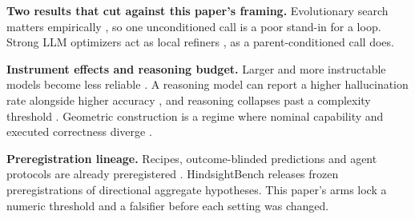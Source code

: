 \textbf{Two results that cut against this paper's framing.} Evolutionary search matters
empirically \citep{zhang2024understandingimportanceevolutionarysearch}, so one unconditioned
call is a poor stand-in for a loop. Strong LLM optimizers act as local refiners
\citep{zhang2026makesllmgoodoptimizer}, as a parent-conditioned call does.

\textbf{Instrument effects and reasoning budget.} Larger and more instructable models become
less reliable \citep{zhou2024reliability}. A reasoning model can report a higher
hallucination rate alongside higher accuracy \citep{openai2025o3o4systemcard}, and reasoning
collapses past a complexity threshold
\citep{shojaee2025illusionthinkingunderstandingstrengths}. Geometric construction is a regime
where nominal capability and executed correctness diverge
\citep{kim2026geobuildbenchbenchmarkinteractiveexecutable,balunovic2025mathconstructchallengingllmreasoning}.

\textbf{Preregistration lineage.} Recipes, outcome-blinded predictions and agent protocols
are already preregistered
\citep{thomas2026mitigatingllmbasedphackingpreregistering,williams2026predictingllmsafetyrelease,vaccaro2026preregistrationexperimentsaiagents,zhang2026testingfrontierlargelanguage}.
HindsightBench \citep{jia2026hindsightbenchblackboxbehavioralaudit} releases frozen
preregistrations of directional aggregate hypotheses. This paper's arms lock a numeric
threshold and a falsifier before each setting was changed.
